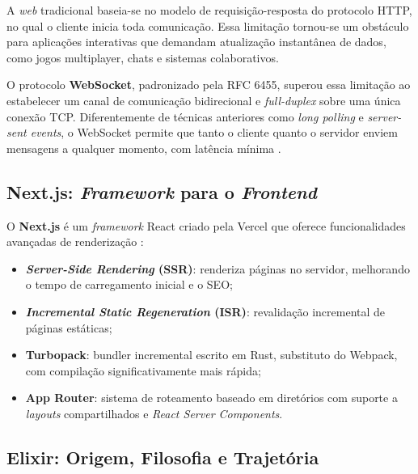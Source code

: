 \documentclass[
	12pt,
	openany,
	oneside,
	a4paper,
	english,
	brazil
]{abntex2}
\begin{document}
A \textit{web} tradicional baseia-se no modelo de requisição-resposta do protocolo HTTP, no qual o cliente inicia toda comunicação. Essa limitação tornou-se um obstáculo para aplicações interativas que demandam atualização instantânea de dados, como jogos multiplayer, chats e sistemas colaborativos.

O protocolo \textbf{WebSocket}, padronizado pela RFC 6455, superou essa limitação ao estabelecer um canal de comunicação bidirecional e \textit{full-duplex} sobre uma única conexão TCP. Diferentemente de técnicas anteriores como \textit{long polling} e \textit{server-sent events}, o WebSocket permite que tanto o cliente quanto o servidor enviem mensagens a qualquer momento, com latência mínima \cite{lubbers2010, puranik2024}.

\subsection{Next.js: \textit{Framework} para o \textit{Frontend}}

O \textbf{Next.js} é um \textit{framework} React criado pela Vercel que oferece funcionalidades avançadas de renderização \cite{nextjs2024}:

\begin{itemize}
  \item \textbf{\textit{Server-Side Rendering} (SSR)}: renderiza páginas no servidor, melhorando o tempo de carregamento inicial e o SEO;
  \item \textbf{\textit{Incremental Static Regeneration} (ISR)}: revalidação incremental de páginas estáticas;
  \item \textbf{Turbopack}: bundler incremental escrito em Rust, substituto do Webpack, com compilação significativamente mais rápida;
  \item \textbf{App Router}: sistema de roteamento baseado em diretórios com suporte a \textit{layouts} compartilhados e \textit{React Server Components}.
\end{itemize}

\subsection{Elixir: Origem, Filosofia e Trajetória}\label{sec:historia_elixir}
\end{document}
